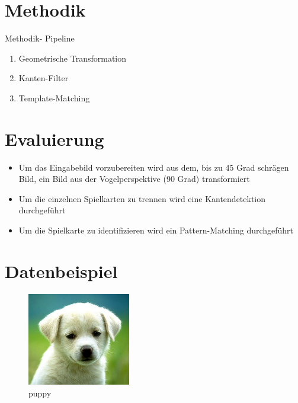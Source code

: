 \documentclass[deutsch]{scrartcl}
\begin{document}
\section{Methodik}
Methodik- Pipeline
\begin{enumerate}
	\item Geometrische Transformation
	\item Kanten-Filter
	\item Template-Matching
\end{enumerate}
\section{Evaluierung}
\begin{itemize}
	\item Um das Eingabebild vorzubereiten wird aus dem, bis zu 45 Grad schrägen Bild, ein Bild aus der Vogelperspektive (90 Grad) transformiert
	\item Um die einzelnen Spielkarten zu trennen wird eine Kantendetektion durchgeführt
	\item Um die Spielkarte zu identifizieren wird ein Pattern-Matching durchgeführt
\end{itemize}
\section{Datenbeispiel}
\begin{figure}[h!]
 \centering
 \includegraphics[width=0.4\textwidth]{img.jpg}
 \caption{puppy}
 \label{fig:img}
\end{figure}
\newpage
\end{document}
